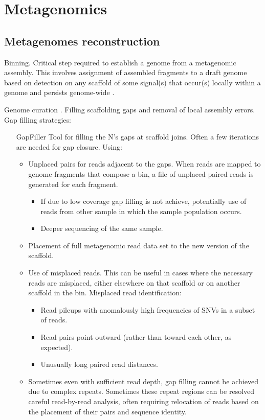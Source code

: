 \chapter{Metagenomics}\label{chp:metagenomics}

\minitoc

\section{Metagenomes reconstruction}
 
Binning. Critical step required to establish a genome from a metagenomic assembly. This involves assignment of assembled 
fragments to a draft genome based on detection on any scaffold of some signal(s) that occur(s) locally within a genome and 
persists genome-wide \cite{Chen2020}. 

Genome curation \cite{Hiltemann2023,microbiome-metagenomics-binning}. Filling scaffolding gaps and removal of local assembly 
errors. Gap filling strategies: 
\begin{itemize}
    \item[GapFiller] Tool for filling the N's gaps at scaffold joins. Often a few iterations are needed for gap closure. Using:
    \begin{itemize}
        \item Unplaced pairs for reads adjacent to the gaps. When reads are mapped to genome fragments that compose a bin, a 
        file of unplaced paired reads is generated for each fragment.
        \begin{itemize}
            \item If due to low coverage gap filling is not achieve, potentially use of reads from other sample in which the sample population occurs.
            \item Deeper sequencing of the same sample.
        \end{itemize}
        \item Placement of full metagenomic read data set to the new version of the scaffold.
        \item Use of misplaced reads. This can be useful in cases where the necessary reads are misplaced, either elsewhere 
        on that scaffold or on another scaffold in the bin. Misplaced read identification:
        \begin{itemize}
            \item Read pileups with anomalously high frequencies of SNVs in a subset of reads.
            \item Read pairs point outward (rather than toward each other, as expected).
            \item Unusually long paired read distances.
        \end{itemize}
        \item Sometimes even with sufficient read depth, gap filling cannot be achieved due to complex repeats. 
        Sometimes these repeat regions can be resolved careful read-by-read analysis, often requiring relocation of reads 
        based on the placement of their pairs and sequence identity.
    \end{itemize}
\end{itemize}

